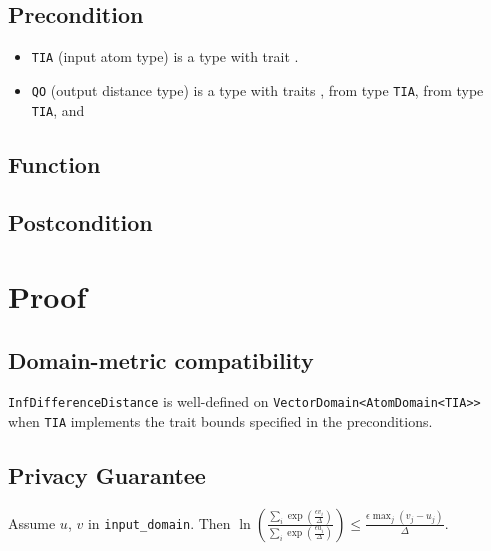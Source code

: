 \documentclass{article}
\begin{document}
\subsection*{Precondition}
\begin{itemize}
    \item \texttt{TIA} (input atom type) is a type with trait .

    \item \texttt{QO} (output distance type) is a type with traits , 
     from type \texttt{TIA}, 
     from type \texttt{TIA}, 
    and 
        
\end{itemize}

\subsection*{Function}
\label{sec:python-pseudocode}


\subsection*{Postcondition}


\section{Proof}
\subsection{Domain-metric compatibility} 
\texttt{InfDifferenceDistance} is well-defined on \texttt{VectorDomain<AtomDomain<TIA>>} 
when \texttt{TIA} implements the trait bounds specified in the preconditions.

\subsection{Privacy Guarantee}


\begin{lemma}
    \label{priv-inequality}
    Assume $u$, $v$ in \texttt{input\_domain}. Then
    $\ln\left(\frac{\sum_{i} \exp(\frac{\epsilon v_i}{\Delta})}{\sum_{i} \exp(\frac{\epsilon u_i}{\Delta})}\right) \le \frac{\epsilon \max_j (v_j - u_j)}{\Delta}$.
\end{lemma}
\end{document}
